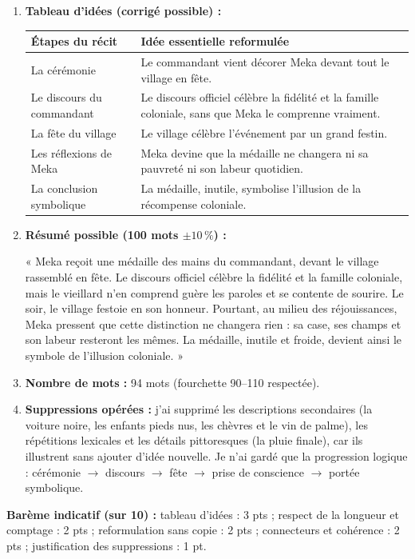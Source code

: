 \documentclass[11pt]{article}
\begin{document}
\begin{corrige}
\begin{enumerate}
\item \textbf{Tableau d'idées (corrigé possible) :}
\begin{center}
\begin{tabularx}{\linewidth}{|l|X|}\hline
\rowcolor{popblueL} \textbf{Étapes du récit} & \textbf{Idée essentielle reformulée} \\ \hline
La cérémonie & Le commandant vient décorer Meka devant tout le village en fête. \\ \hline
Le discours du commandant & Le discours officiel célèbre la fidélité et la famille coloniale, sans que Meka le comprenne vraiment. \\ \hline
La fête du village & Le village célèbre l'événement par un grand festin. \\ \hline
Les réflexions de Meka & Meka devine que la médaille ne changera ni sa pauvreté ni son labeur quotidien. \\ \hline
La conclusion symbolique & La médaille, inutile, symbolise l'illusion de la récompense coloniale. \\ \hline
\end{tabularx}
\end{center}
\item \textbf{Résumé possible (100 mots $\pm 10\,\%$) :}

« Meka reçoit une médaille des mains du commandant, devant le village rassemblé en fête. Le discours officiel célèbre la fidélité et la famille coloniale, mais le vieillard n'en comprend guère les paroles et se contente de sourire. Le soir, le village festoie en son honneur. Pourtant, au milieu des réjouissances, Meka pressent que cette distinction ne changera rien : sa case, ses champs et son labeur resteront les mêmes. La médaille, inutile et froide, devient ainsi le symbole de l'illusion coloniale. »

\item \textbf{Nombre de mots :} 94 mots (fourchette 90--110 respectée).
\item \textbf{Suppressions opérées :} j'ai supprimé les descriptions secondaires (la voiture noire, les enfants pieds nus, les chèvres et le vin de palme), les répétitions lexicales et les détails pittoresques (la pluie finale), car ils illustrent sans ajouter d'idée nouvelle. Je n'ai gardé que la progression logique : cérémonie $\rightarrow$ discours $\rightarrow$ fête $\rightarrow$ prise de conscience $\rightarrow$ portée symbolique.
\end{enumerate}
\textbf{Barème indicatif (sur 10) :} tableau d'idées : 3 pts ; respect de la longueur et comptage : 2 pts ; reformulation sans copie : 2 pts ; connecteurs et cohérence : 2 pts ; justification des suppressions : 1 pt.
\end{corrige}
\end{document}
